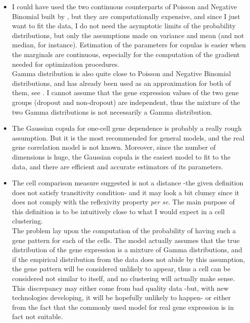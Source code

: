 \documentclass{report}
\begin{document}
{\begin{itemize}
For instance, $f_1$ would be the Poisson density function, and $f_2$ be the Negative Binomial density function. But note that this model assumes that the dropout part (that is, the Poisson component of the mixture) is the only one source of null gene expression values. But I consider that transcriptionally silent genes, that is, whose sequence does not appear in the mRNA molecule, also give quasi-zero values\cite{kharchenko2014bayesian}. 

\item I could have used the two continuous counterparts of Poisson and Negative Binomial built by \cite{ilienko2013continuous}\cite{chandra2012continuous}\cite{abid2016continuous}, but they are computationally expensive, and since I just want to fit the data, I do not need the asymptotic limits of the probability distributions, but only the assumptions made on variance and mean (and not median, for instance). Estimation of the parameters for copulas is easier when the marginals are continuous, especially for the computation of the gradient needed for optimization procedures.\\

Gamma distribution is also quite close to Poisson and Negative Binomial distributions, and has already been used as an approximation for both of them, see \cite{best1974improved}\cite{guenther1972simple}. I cannot assume that the gene expression values of the two gene groups (dropout and non-dropout) are independent, thus the mixture of the two Gamma distributions is not necessarily a Gamma distribution.

\item The Gaussian copula for one-cell gene dependence is probably a really rough assumption. But it is the most recommended for general models\cite{inouye2017review}, and the real gene correlation model is not known. Moreover, since the number of dimensions is huge, the Gaussian copula is the easiest model to fit to the data, and there are efficient and accurate estimators of its parameters. 

\item The cell comparison measure suggested is not a distance -the given definition does not satisfy transitivity condition- and it may look a bit clumsy since it does not comply with the reflexivity property \emph{per se}. The main purpose of this definition is to be intuitively close to what I would expect in a cell clustering.\\

The problem lay upon the computation of the probability of having such a gene pattern for each of the cells. The model actually assumes that the true distribution of the gene expression is a mixture of Gamma distributions, and if the empirical distribution from the data does not abide by this assumption, the gene pattern will be considered unlikely to appear, thus a cell can be considered not similar to itself, and no clustering will actually make sense. This discrepancy may either come from bad quality data -but, with new technologies developing, it will be hopefully unlikely to happen- or either from the fact that the commonly used model for real gene expression is in fact not suitable.\\


\end{itemize}}
\end{document}
